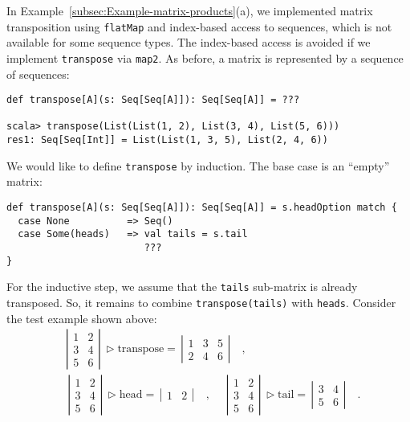 In Example~\ref{subsec:Example-matrix-products}(a),
we implemented matrix transposition using \lstinline!flatMap! and
index-based access to sequences, which is not available for some sequence
types. The index-based access is avoided if we implement \lstinline!transpose!
via \lstinline!map2!. As before, a matrix is represented by a sequence
of sequences:
\begin{lstlisting}
def transpose[A](s: Seq[Seq[A]]): Seq[Seq[A]] = ???

scala> transpose(List(List(1, 2), List(3, 4), List(5, 6)))
res1: Seq[Seq[Int]] = List(List(1, 3, 5), List(2, 4, 6))
\end{lstlisting}
We would like to define \lstinline!transpose! by induction. The base
case is an \textsf{``}empty\textsf{''} matrix:
\begin{lstlisting}
def transpose[A](s: Seq[Seq[A]]): Seq[Seq[A]] = s.headOption match {
  case None          => Seq()
  case Some(heads)   => val tails = s.tail
                        ???
}
\end{lstlisting}
For the inductive step, we assume that the \lstinline!tails! sub-matrix
is already transposed. So, it remains to combine \lstinline!transpose(tails)!
with \lstinline!heads!. Consider the test example shown above:
\begin{align*}
 & \left|\begin{array}{cc}
1 & 2\\
3 & 4\\
5 & 6
\end{array}\right|\,\triangleright\text{transpose}=\,\left|\begin{array}{ccc}
1 & 3 & 5\\
2 & 4 & 6
\end{array}\right|\quad,\\
 & \,\left|\begin{array}{cc}
1 & 2\\
3 & 4\\
5 & 6
\end{array}\right|\,\triangleright\text{head}=\,\left|\begin{array}{cc}
1 & 2\end{array}\right|\quad,\,\,\quad\left|\begin{array}{cc}
1 & 2\\
3 & 4\\
5 & 6
\end{array}\right|\,\triangleright\text{tail}=\,\left|\begin{array}{cc}
3 & 4\\
5 & 6
\end{array}\right|\quad.
\end{align*}
